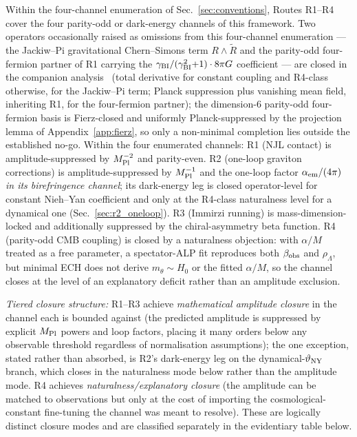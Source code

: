 \documentclass[aps,prd,twocolumn,superscriptaddress,showpacs,preprintnumbers,nofootinbib,longbibliography,floatfix]{revtex4-2}
\begin{document}
Within the four-channel enumeration of Sec.~\ref{sec:conventions},
Routes R1--R4 cover the four parity-odd or dark-energy channels of this
framework. Two operators occasionally raised as omissions from this
four-channel enumeration --- the Jackiw--Pi gravitational Chern--Simons
term $R\!\wedge\!\widetilde R$ and the parity-odd four-fermion partner of
R1 carrying the $\gamma_{\rm BI}/(\gamma_{\rm BI}^2{+}1)\cdot 8\pi G$
coefficient --- are closed in the companion analysis~\cite{Golden2026P1a}
(total derivative for constant coupling and R4-class otherwise, for the
Jackiw--Pi term; Planck suppression plus vanishing mean field, inheriting
R1, for the four-fermion partner); the dimension-6 parity-odd
four-fermion basis is Fierz-closed and uniformly Planck-suppressed by the
projection lemma of Appendix~\ref{app:fierz}, so only a non-minimal
completion lies outside the established no-go. Within the four
enumerated channels: R1 (NJL contact) is amplitude-suppressed by
$M_{\rm Pl}^{-2}$ and parity-even. R2 (one-loop graviton corrections) is
amplitude-suppressed by $M_{\rm Pl}^{-1}$ and the one-loop factor
$\alpha_{\rm em}/(4\pi)$ \emph{in its birefringence channel}; its
dark-energy leg is closed operator-level for constant Nieh--Yan
coefficient and only at the R4-class naturalness level for a dynamical
one (Sec.~\ref{sec:r2_oneloop}). R3 (Immirzi running) is mass-dimension-locked
and additionally suppressed by the chiral-asymmetry beta function. R4
(parity-odd CMB coupling) is closed by a naturalness objection: with
$\alpha/M$ treated as a free parameter, a spectator-ALP fit reproduces
both $\beta_{\rm obs}$ and $\rho_\Lambda$, but minimal ECH does not
derive $m_\theta\sim H_0$ or the fitted $\alpha/M$, so the channel closes
at the level of an explanatory deficit rather than an amplitude
exclusion.

\emph{Tiered closure structure:} R1--R3 achieve \emph{mathematical
amplitude closure} in the channel each is bounded against (the predicted
amplitude is suppressed by explicit
$M_{\rm Pl}$ powers and loop factors, placing it many orders below any
observable threshold regardless of normalisation assumptions); the one
exception, stated rather than absorbed, is R2's dark-energy leg on the
dynamical-$\vartheta_{\rm NY}$ branch, which closes in the
naturalness mode below rather than the amplitude mode.
R4 achieves \emph{naturalness/explanatory closure} (the amplitude can
be matched to observations but only at the cost of importing the
cosmological-constant fine-tuning the channel was meant to resolve).
These are logically distinct closure modes and are classified
separately in the evidentiary table below.
\end{document}
